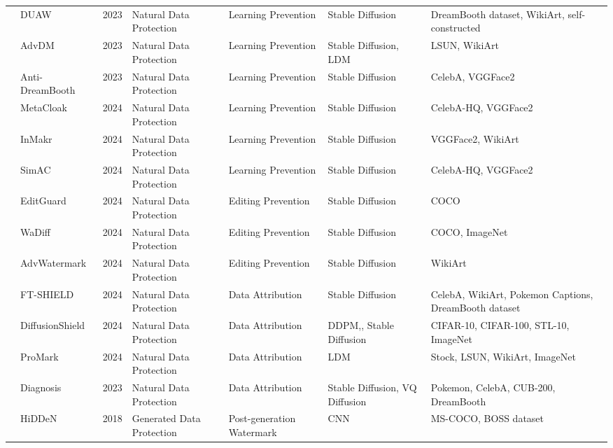 \begin{table*}[htp]
{\begin{tabular}{p{}p{}p{}p{}p{}p{}p{}}
\cellcolor{white} & DUAW\cite{ye2023duaw} & 2023 & Natural Data Protection & Learning Prevention & Stable Diffusion & DreamBooth dataset, WikiArt, self-constructed \\
\cellcolor{white} & AdvDM\cite{liang2023adversarial} & 2023 & Natural Data Protection & Learning Prevention & Stable Diffusion, LDM & LSUN, WikiArt \\
\cellcolor{white} & Anti-DreamBooth\cite{van2023anti} & 2023 & Natural Data Protection & Learning Prevention & Stable Diffusion & CelebA, VGGFace2\\
\cellcolor{white} &  MetaCloak\cite{liu2024metacloak} & 2024 & Natural Data Protection & Learning Prevention & Stable Diffusion & CelebA-HQ, VGGFace2 \\
\cellcolor{white} &  InMakr\cite{liu2024countering} & 2024 & Natural Data Protection & Learning Prevention & Stable Diffusion &  VGGFace2, WikiArt   \\
\cellcolor{white} &  SimAC\cite{wang2024simac} & 2024 & Natural Data Protection & Learning Prevention & Stable Diffusion & CelebA-HQ, VGGFace2  \\
\cellcolor{white} & EditGuard\cite{zhang2024editguard} & 2024 & Natural Data Protection & Editing Prevention & Stable Diffusion  & COCO   \\
\cellcolor{white} & WaDiff\cite{min2024watermark} & 2024 & Natural Data Protection & Editing Prevention & Stable Diffusion & COCO, ImageNet   \\
\cellcolor{white} & AdvWatermark\cite{zhu2024watermark} & 2024 & Natural Data Protection & Editing Prevention & Stable Diffusion & WikiArt \\
\cellcolor{white} & FT-SHIELD\cite{cui2023ft} & 2024 & Natural Data Protection & Data Attribution & Stable Diffusion & CelebA, WikiArt, Pokemon Captions, DreamBooth dataset \\
\cellcolor{white} & DiffusionShield\cite{cui2023diffusionshield} & 2024 & Natural Data Protection & Data Attribution & DDPM,, Stable Diffusion & CIFAR-10, CIFAR-100, STL-10, ImageNet \\
\cellcolor{white} &  ProMark\cite{asnani2024promark} & 2024 & Natural Data Protection & Data Attribution & LDM & Stock, LSUN, WikiArt, ImageNet\\
\cellcolor{white} & Diagnosis~\cite{wang2023diagnosis} & 2023 & Natural Data Protection & Data Attribution  & Stable Diffusion, VQ Diffusion & Pokemon, CelebA,  CUB-200, DreamBooth \\
\cellcolor{white} & HiDDeN\cite{zhu2018hidden} & 2018 & Generated Data Protection & Post-generation Watermark & CNN & MS-COCO, BOSS dataset \\

\end{tabular}}
\end{table*}
